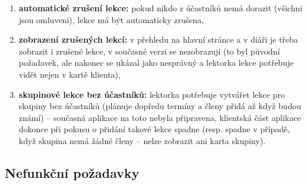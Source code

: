 \begin{enumerate}[label=\textbf{F\arabic*}]
    \item \label{F19} \textbf{automatické zrušení lekce:} pokud nikdo z účastníků nemá dorazit (všichni jsou omluveni), lekce má být automaticky zrušena,
    \item \label{F20} \textbf{zobrazení zrušených lekcí:} v přehledu na hlavní stránce a v diáři je třeba zobrazit i zrušené lekce, v současné verzi se nezobrazují (to byl původní požadavek, ale nakonec se ukázal jako nesprávný a lektorka lekce potřebuje vidět nejen v kartě klienta),
    \item \label{F21} \textbf{skupinové lekce bez účastníků:} lektorka potřebuje vytvářet lekce pro skupiny bez účastníků (plánuje dopředu termíny a členy přidá až když budou známí) -- současná aplikace na toto nebyla připravena, klientská část aplikace dokonce při pokusu o přidání takové lekce spadne (resp. spadne v případě, když skupina nemá žádné členy -- nelze zobrazit ani karta skupiny).
\end{enumerate}

\subsection{Nefunkční požadavky}

